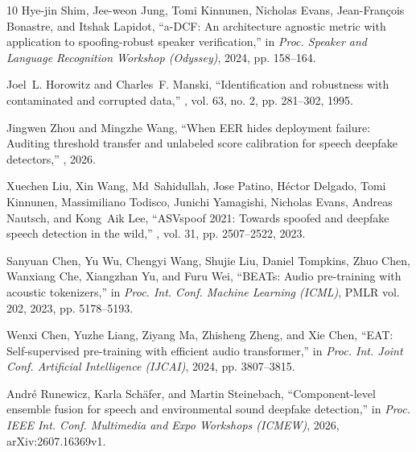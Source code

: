 \documentclass{article}
\begin{document}
\begin{thebibliography}{10}
Hye-jin Shim, Jee-weon Jung, Tomi Kinnunen, Nicholas Evans, Jean-Fran\c{c}ois Bonastre, and Itshak Lapidot,
\newblock ``{a-DCF}: An architecture agnostic metric with application to spoofing-robust speaker verification,''
\newblock in {\em Proc. Speaker and Language Recognition Workshop (Odyssey)}, 2024, pp. 158--164.

Joel~L. Horowitz and Charles~F. Manski,
\newblock ``Identification and robustness with contaminated and corrupted data,''
, vol. 63, no. 2, pp. 281--302, 1995.

Jingwen Zhou and Mingzhe Wang,
\newblock ``When {EER} hides deployment failure: Auditing threshold transfer and unlabeled score calibration for speech deepfake detectors,''
, 2026.

Xuechen Liu, Xin Wang, Md~Sahidullah, Jose Patino, H\'{e}ctor Delgado, Tomi Kinnunen, Massimiliano Todisco, Junichi Yamagishi, Nicholas Evans, Andreas Nautsch, and Kong~Aik Lee,
\newblock ``{ASVspoof} 2021: Towards spoofed and deepfake speech detection in the wild,''
, vol. 31, pp. 2507--2522, 2023.

Sanyuan Chen, Yu Wu, Chengyi Wang, Shujie Liu, Daniel Tompkins, Zhuo Chen, Wanxiang Che, Xiangzhan Yu, and Furu Wei,
\newblock ``{BEATs}: Audio pre-training with acoustic tokenizers,''
\newblock in {\em Proc. Int. Conf. Machine Learning (ICML)}, PMLR vol. 202, 2023, pp. 5178--5193.

Wenxi Chen, Yuzhe Liang, Ziyang Ma, Zhisheng Zheng, and Xie Chen,
\newblock ``{EAT}: Self-supervised pre-training with efficient audio transformer,''
\newblock in {\em Proc. Int. Joint Conf. Artificial Intelligence (IJCAI)}, 2024, pp. 3807--3815.

Andr\'{e} Runewicz, Karla Sch\"{a}fer, and Martin Steinebach,
\newblock ``Component-level ensemble fusion for speech and environmental sound deepfake detection,''
\newblock in {\em Proc. IEEE Int. Conf. Multimedia and Expo Workshops (ICMEW)}, 2026, arXiv:2607.16369v1.

\end{thebibliography}
\end{document}

